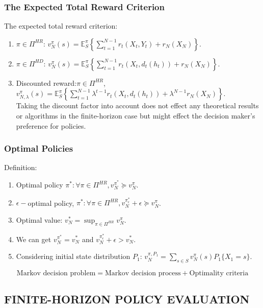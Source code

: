\subsubsection{The Expected Total Reward Criterion}%

The expected total reward criterion:
\begin{enumerate}
    \item $ \pi \in \Pi^{HR} $:
        $ v^\pi_N(s) = \mathbb{E}^\pi_S \left\{ \sum^{N-1}_{t=1} r_t(X_t, Y_t) + r_N(X_N) \right\}. $
    \item $ \pi \in \Pi^{HD} $:
        $ v^\pi_N(s) = \mathbb{E}^\pi_S \left\{ \sum^{N-1}_{t=1} r_t(X_t, d_t(h_t)) + r_N(X_N) \right\}. $
    \item Discounted reward:$ \pi \in \Pi^{HR} $,\\
        $ v^\pi_{N, \lambda}(s) = \mathbb{E}^\pi_S \left\{ \sum^{N-1}_{t=1} \lambda^{t-1}r_t(X_t, d_t(h_t)) + \lambda^{N-1}r_N(X_N) \right\}. $\\
        Taking the discount factor into account does not effect any theoretical results or algorithms in the finite-horizon case but might effect the decision maker's preference for policies.
\end{enumerate}

\subsubsection{Optimal Policies}
Definition:
\begin{enumerate}
    \item Optimal policy $ \pi^*: \forall \pi \in \Pi^{HR}, v^{\pi^*}_N \succeq v^\pi_N $.
    \item $ \epsilon-$optimal policy, $ \pi^*: \forall \pi \in \Pi^{HR}, v^{\pi^*_\epsilon}_N + \epsilon \succeq v^\pi_N $.
    \item Optimal value: $ v^*_N = \sup_{\pi\in\Pi^{HR}} v^\pi_N $. 
    \item We can get $ v^{\pi^*}_N = v^*_N $ and $ v^{\pi^*_\epsilon}_N + \epsilon > v^*_N $.
    \item Considering initial state distribution $ P_1 $:
        $ v^{\pi, P_1}_N = \sum^{}_{s\in S} v^\pi_{N}(s) P_1 \{ X_1 = s \} $.
\end{enumerate}
\[   
    \text{Markov decision problem} = \text{Markov decision process} + \text{Optimality criteria}
\]

\subsection{FINITE-HORIZON POLICY EVALUATION}%
\label{sub:finite_horizon_policy_evaluation}

